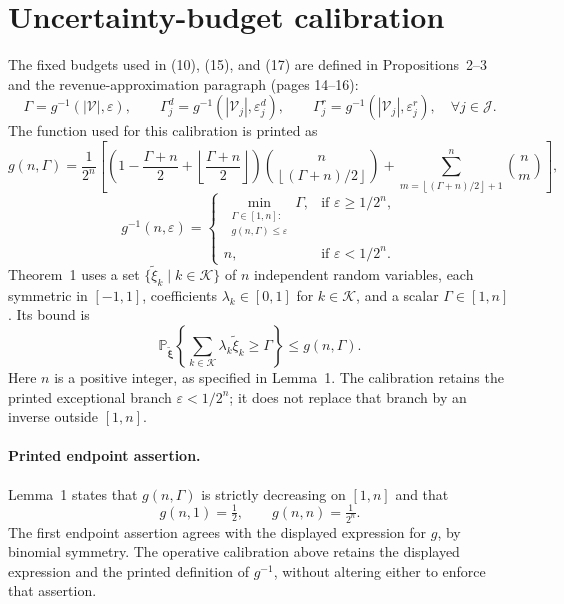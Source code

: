 \documentclass{article}
\begin{document}
\section*{Uncertainty-budget calibration}
The fixed budgets used in (10), (15), and (17) are defined in Propositions~2--3 and the revenue-approximation paragraph (pages 14--16):
\[
\Gamma=g^{-1}(|\mathcal V|,\varepsilon),\qquad
\Gamma^d_j=g^{-1}(|\mathcal V_j|,\varepsilon^d_j),\qquad
\Gamma^r_j=g^{-1}(|\mathcal V_j|,\varepsilon^r_j),\quad\forall j\in\mathcal J.
\]
The function used for this calibration is printed as
\[
g(n,\Gamma)=\frac{1}{2^n}\left[
\left(1-\frac{\Gamma+n}{2}+\left\lfloor\frac{\Gamma+n}{2}\right\rfloor\right)
\binom{n}{\left\lfloor(\Gamma+n)/2\right\rfloor}
+\sum_{m=\left\lfloor(\Gamma+n)/2\right\rfloor+1}^{n}\binom{n}{m}
\right],
\]
\[
g^{-1}(n,\varepsilon)=
\begin{cases}
\displaystyle\min_{\substack{\Gamma\in[1,n]:\\g(n,\Gamma)\leq\varepsilon}}\Gamma,
&\text{if }\varepsilon\geq1/2^n,\\[2mm]
n,&\text{if }\varepsilon<1/2^n.
\end{cases}
\]
Theorem~1 uses a set $\{\tilde\xi_k\mid k\in\mathcal K\}$ of $n$ independent random variables, each symmetric in $[-1,1]$, coefficients $\lambda_k\in[0,1]$ for $k\in\mathcal K$, and a scalar $\Gamma\in[1,n]$. Its bound is
\[
\mathbb P_{\tilde{\boldsymbol\xi}}\left\{\sum_{k\in\mathcal K}\lambda_k\tilde\xi_k\geq\Gamma\right\}\leq g(n,\Gamma).
\]
Here $n$ is a positive integer, as specified in Lemma~1. The calibration retains the printed exceptional branch $\varepsilon<1/2^n$; it does not replace that branch by an inverse outside $[1,n]$.

\paragraph{Printed endpoint assertion.}
Lemma~1 states that $g(n,\Gamma)$ is strictly decreasing on $[1,n]$ and that
\[
g(n,1)=\tfrac12,\qquad g(n,n)=\tfrac{1}{2^n}.
\]
The first endpoint assertion agrees with the displayed expression for $g$, by binomial symmetry. The operative calibration above retains the displayed expression and the printed definition of $g^{-1}$, without altering either to enforce that assertion.
\end{document}
